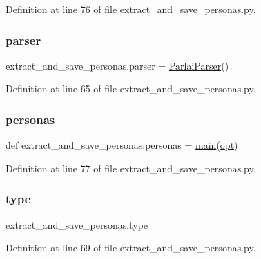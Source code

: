 Definition at line 76 of file extract\+\_\+and\+\_\+save\+\_\+personas.\+py.

\mbox{\label{namespaceextract__and__save__personas_ae07f40cdfaf4942445be7ad429f3f7c5}} 
\subsubsection{\texorpdfstring{parser}{parser}}
{\footnotesize\ttfamily extract\+\_\+and\+\_\+save\+\_\+personas.\+parser = \hyperlink{classparlai_1_1core_1_1params_1_1ParlaiParser}{Parlai\+Parser}()}



Definition at line 65 of file extract\+\_\+and\+\_\+save\+\_\+personas.\+py.

\mbox{\label{namespaceextract__and__save__personas_a11c31165d1c524ef4bd4b4abd28a018e}} 
\subsubsection{\texorpdfstring{personas}{personas}}
{\footnotesize\ttfamily def extract\+\_\+and\+\_\+save\+\_\+personas.\+personas = \hyperlink{namespaceextract__and__save__personas_abb9b78f74e9baf9fa763bff3c1b99381}{main}(\hyperlink{namespaceextract__and__save__personas_aff53e2793525b34ab0aff249a99f7614}{opt})}



Definition at line 77 of file extract\+\_\+and\+\_\+save\+\_\+personas.\+py.

\mbox{\label{namespaceextract__and__save__personas_af116e2357189d9aa2affa8415c755753}} 
\subsubsection{\texorpdfstring{type}{type}}
{\footnotesize\ttfamily extract\+\_\+and\+\_\+save\+\_\+personas.\+type}



Definition at line 69 of file extract\+\_\+and\+\_\+save\+\_\+personas.\+py.

